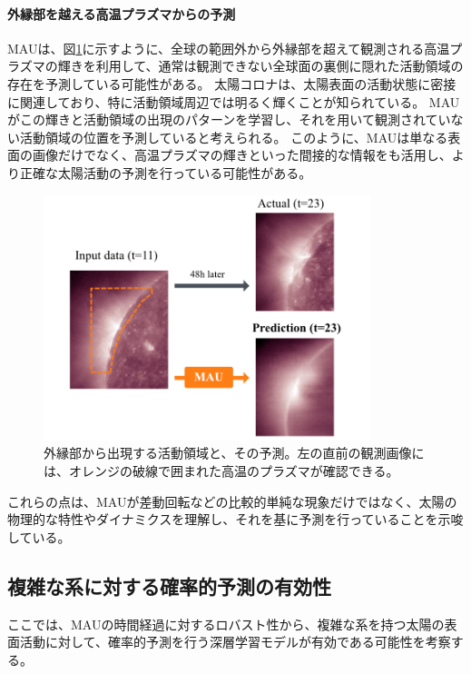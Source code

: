       \paragraph{外縁部を越える高温プラズマからの予測}
        MAUは、図\ref{fig:limb_prediction}に示すように、全球の範囲外から外縁部を超えて観測される高温プラズマの輝きを利用して、通常は観測できない全球面の裏側に隠れた活動領域の存在を予測している可能性がある。
        太陽コロナは、太陽表面の活動状態に密接に関連しており、特に活動領域周辺では明るく輝くことが知られている。
        MAUがこの輝きと活動領域の出現のパターンを学習し、それを用いて観測されていない活動領域の位置を予測していると考えられる。
        このように、MAUは単なる表面の画像だけでなく、高温プラズマの輝きといった間接的な情報をも活用し、より正確な太陽活動の予測を行っている可能性がある。
        \begin{figure}
          \centering
          \includegraphics[width=0.85\textwidth]{figures/exp1/limb_prediction.jpg}
          \caption{外縁部から出現する活動領域と、その予測。左の直前の観測画像には、オレンジの破線で囲まれた高温のプラズマが確認できる。}
          \label{fig:limb_prediction}
        \end{figure}

      これらの点は、MAUが差動回転などの比較的単純な現象だけではなく、太陽の物理的な特性やダイナミクスを理解し、それを基に予測を行っていることを示唆している。
    
    \subsection{複雑な系に対する確率的予測の有効性}
      ここでは、MAUの時間経過に対するロバスト性から、複雑な系を持つ太陽の表面活動に対して、確率的予測を行う深層学習モデルが有効である可能性を考察する。

